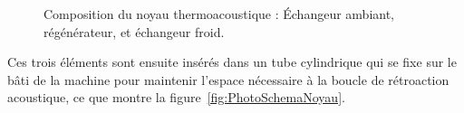 \begin{figure}[!ht]
    \centering
	\begin{subfigure}{.32\textwidth}
		\centering
		\caption{}
		\label{fig:TacotPhotosNoyau_AHX}
	\end{subfigure}		
	\begin{subfigure}{.32\textwidth}
		\centering
		\caption{}
		\label{fig:TacotPhotosNoyau_Regen}
	\end{subfigure}	
	\begin{subfigure}{.32\textwidth}
		\centering
		\caption{}
		\label{fig:TacotPhotosNoyau_CHX}
	\end{subfigure}	    
    \caption{Composition du noyau thermoacoustique :  \'Echangeur ambiant,  régénérateur, et  échangeur froid.}
    \label{fig:TacotPhotosNoyau}
\end{figure}

Ces trois éléments sont ensuite insérés dans un tube cylindrique qui se fixe sur le bâti de la machine pour maintenir l'espace nécessaire à la boucle de rétroaction acoustique, ce que montre la figure~\ref{fig:PhotoSchemaNoyau}.


